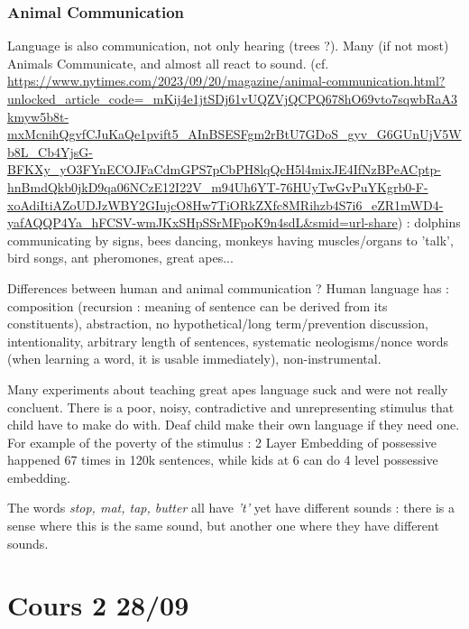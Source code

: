\documentclass{cours}
\begin{document}
\section{Animal Communication}
Language is also communication, not only hearing (trees ?). Many (if not most) Animals Communicate, and almost all react to sound. (cf. \href{NYT Article}{\url{https://www.nytimes.com/2023/09/20/magazine/animal-communication.html?unlocked_article_code=_mKij4e1jtSDj61vUQZVjQCPQ678hO69vto7sqwbRaA3kmyw5b8t-mxMcnihQgvfCJuKaQe1pvift5_AInBSESFgm2rBtU7GDoS_gyv_G6GUnUjV5Wb8L_Cb4YjsG-BFKXy_yO3FYnECOJFaCdmGPS7pCbPH8lqQcH5l4mixJE4IfNzBPeACptp-hnBmdQkb0jkD9qa06NCzE12I22V_m94Uh6YT-76HUyTwGvPuYKgrb0-F-xoAdiItiAZoUDJzWBY2GIujcO8Hw7TiORkZXfc8MRihzb4S7i6_eZR1mWD4-yafAQQP4Ya_hFCSV-wmJKxSHpSSrMFpoK9n4sdL&smid=url-share}}) : dolphins communicating by signs, bees dancing, monkeys having muscles/organs to 'talk', bird songs, ant pheromones, great apes... 

Differences between human and animal communication ? Human language has : composition (recursion : meaning of sentence can be derived from its constituents), abstraction, no hypothetical/long term/prevention discussion, intentionality, arbitrary length of sentences, systematic neologisms/nonce words (when learning a word, it is usable immediately), non-instrumental.

Many experiments about teaching great apes language suck and were not really concluent. There is a poor, noisy, contradictive and unrepresenting stimulus that child have to make do with. Deaf child make their own language if they need one. For example of the poverty of the stimulus : 2 Layer Embedding of possessive happened 67 times in 120k sentences, while kids at 6 can do 4 level possessive embedding. 

The words \textsl{stop, mat, tap, butter} all have \textsl{'t'} yet have different sounds : there is a sense where this is the same sound, but another one where they have different sounds.

\part[(Non-)Variation and Languages]{Cours 2 28/09}
\end{document}
